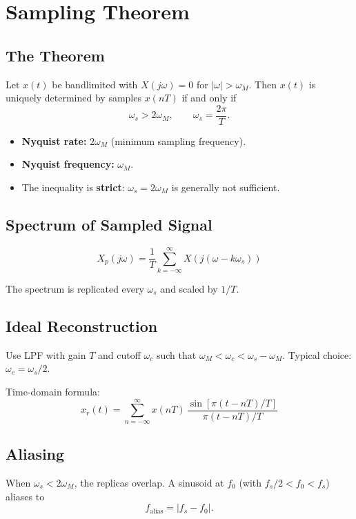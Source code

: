 \documentclass{article}
\begin{document}
\section{Sampling Theorem}

\subsection{The Theorem}

Let $x(t)$ be bandlimited with $X(j\omega)=0$ for $|\omega|>\omega_M$. Then $x(t)$ is uniquely determined by samples $x(nT)$ if and only if
$$\omega_s > 2\omega_M, \qquad \omega_s = \frac{2\pi}{T}.$$

\begin{itemize}
  \item \textbf{Nyquist rate:} $2\omega_M$ (minimum sampling frequency).
  \item \textbf{Nyquist frequency:} $\omega_M$.
  \item The inequality is \textbf{strict}: $\omega_s = 2\omega_M$ is generally not sufficient.
\end{itemize}

\subsection{Spectrum of Sampled Signal}

$$X_p(j\omega) = \frac{1}{T}\sum_{k=-\infty}^{\infty} X(j(\omega - k\omega_s))$$

The spectrum is replicated every $\omega_s$ and scaled by $1/T$.

\subsection{Ideal Reconstruction}

Use LPF with gain $T$ and cutoff $\omega_c$ such that $\omega_M < \omega_c < \omega_s - \omega_M$. Typical choice: $\omega_c = \omega_s/2$.

Time-domain formula:
$$x_r(t) = \sum_{n=-\infty}^{\infty} x(nT)\,\frac{\sin[\pi(t-nT)/T]}{\pi(t-nT)/T}$$

\subsection{Aliasing}

When $\omega_s < 2\omega_M$, the replicas overlap. A sinusoid at $f_0$ (with $f_s/2 < f_0 < f_s$) aliases to
$$f_\text{alias} = |f_s - f_0|.$$
\end{document}
